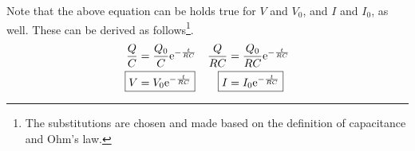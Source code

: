 \documentclass{article}
\newcommand{\e}[1][]{\text{e}^{#1}}
\begin{document}
Note that the above equation can be holds true for $V$ and $V_0$, and $I$ and $I_0$, as well. These can be derived as follows\footnote{The substitutions are chosen and made based on the definition of capacitance and Ohm's law.}.
\begin{align*}
    \frac{Q}{C} &= \frac{Q_0}{C}\e[-\frac{t}{RC}]&
        \frac{Q}{RC} &= \frac{Q_0}{RC}\e[-\frac{t}{RC}]\\
    \Aboxed{V &= V_0\e[-\frac{t}{RC}]}&
        \Aboxed{I &= I_0\e[-\frac{t}{RC}]}\\
\end{align*}
\end{document}
